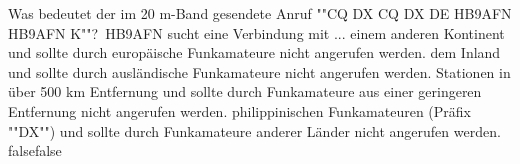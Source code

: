     {Was bedeutet der im 20 m-Band gesendete Anruf ""CQ DX CQ DX DE HB9AFN HB9AFN K""? HB9AFN sucht eine Verbindung mit ...}
    {einem anderen Kontinent und sollte durch europäische Funkamateure nicht angerufen werden.}
    {dem Inland und sollte durch ausländische Funkamateure nicht angerufen werden.}
    {Stationen in über 500 km Entfernung und sollte durch Funkamateure aus einer geringeren Entfernung nicht angerufen werden.}
    {philippinischen Funkamateuren (Präfix ""DX"") und sollte durch Funkamateure anderer Länder nicht angerufen werden.}
    {false}{false}